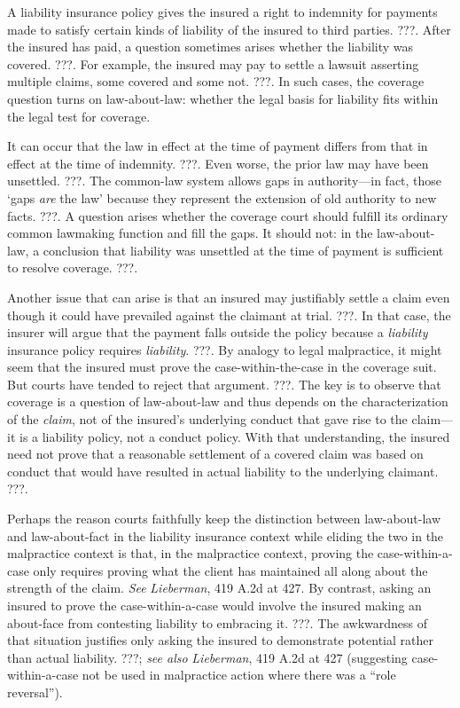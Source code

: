 \documentclass[
  12pt,
  letterpaper,
]{scrartcl}
\begin{document}
A liability insurance policy gives the insured a right to indemnity for
payments made to satisfy certain kinds of liability of the insured to third
parties. ???. After the insured has paid, a question sometimes arises whether
the liability was covered. ???. For example, the insured may pay to settle a
lawsuit asserting multiple claims, some covered and some not. ???. In such
cases, the coverage question turns on law-about-law: whether the legal basis
for liability fits within the legal test for coverage.

It can occur that the law in effect at the time of payment differs from that in
effect at the time of indemnity. ???. Even worse, the prior law may have been
unsettled. ???. The common-law system allows gaps in authority---in fact, those
`gaps \emph{are} the law' because they represent the extension of old authority
to new facts. ???. A question arises whether the coverage court should fulfill
its ordinary common lawmaking function and fill the gaps. It should not: in the
law-about-law, a conclusion that liability was unsettled at the time of payment
is sufficient to resolve coverage. ???.

Another issue that can arise is that an insured may justifiably settle a claim
even though it could have prevailed against the claimant at trial. ???. In that
case, the insurer will argue that the payment falls outside the policy because
a \emph{liability} insurance policy requires \emph{liability}. ???. By analogy
to legal malpractice, it might seem that the insured must prove the
case-within-the-case in the coverage suit. But courts have tended to reject
that argument. ???. The key is to observe that coverage is a question of
law-about-law and thus depends on the characterization of the \emph{claim}, not
of the insured's underlying conduct that gave rise to the claim---it is a
liability policy, not a conduct policy. With that understanding, the insured
need not prove that a reasonable settlement of a covered claim was based on
conduct that would have resulted in actual liability to the underlying
claimant. ???.

Perhaps the reason courts faithfully keep the distinction between
law-about-law and law-about-fact in the liability insurance context while
eliding the two in the malpractice context is that, in the malpractice context,
proving the case-within-a-case only requires proving what the client has
maintained all along about the strength of the claim. \textit{See}
\textit{Lieberman}, 419 A.2d at 427. By contrast, asking an insured to prove
the case-within-a-case would involve the insured making an about-face from
contesting liability to embracing it. ???. The awkwardness of that situation
justifies only asking the insured to demonstrate potential rather than actual
liability. ???; \textit{see also} \textit{Lieberman}, 419 A.2d at 427
(suggesting case-within-a-case not be used in malpractice action where there
was a ``role reversal'').
\end{document}

